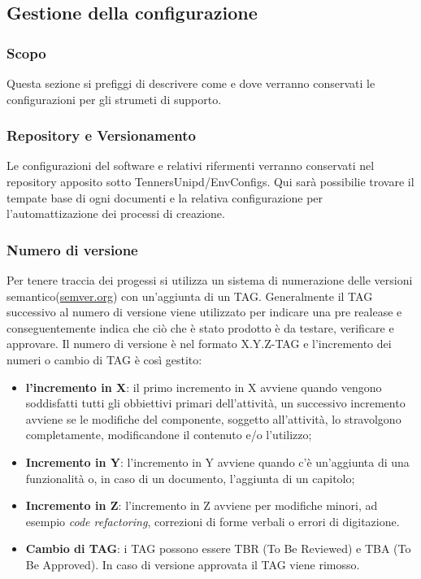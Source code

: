 \subsection{Gestione della configurazione}
\subsubsection{Scopo}
Questa sezione si prefiggi di descrivere come e dove verranno conservati le configurazioni
per gli strumeti di supporto.
\subsubsection{Repository e Versionamento}
Le configurazioni del software e relativi rifermenti verranno conservati nel repository
apposito sotto TennersUnipd/EnvConfigs.
Qui sarà possibilie trovare il tempate base di ogni documenti e la relativa configurazione
per l'automattizazione dei processi di creazione.

\subsubsection{Numero di versione}
Per tenere traccia dei progessi si utilizza un sistema di numerazione delle versioni
semantico(\href{https://semver.org/lang/it/}{semver.org}) con un'aggiunta di un TAG.
Generalmente il TAG successivo al numero di versione viene utilizzato per indicare una
pre realease e conseguentemente indica che ciò che è stato prodotto è da testare,
verificare e approvare.
Il numero di versione è nel formato X.Y.Z-TAG e l'incremento dei numeri o cambio
di TAG è così gestito:
\begin{itemize}
  \item \textbf{l'incremento in X}: il primo incremento in X avviene quando vengono
  soddisfatti tutti gli obbiettivi primari dell'attività, un successivo incremento
  avviene se le modifiche del componente, soggetto all'attività, lo stravolgono
  completamente, modificandone il contenuto e/o l'utilizzo;
  \item \textbf{Incremento in Y}: l'incremento in Y avviene quando c'è un'aggiunta
  di una funzionalità o, in caso di un documento, l'aggiunta di un capitolo;
  \item \textbf{Incremento in Z}: l'incremento in Z avviene per modifiche minori,
  ad esempio \textit{code refactoring\glos}, correzioni di forme verbali o errori di digitazione.
  \item \textbf{Cambio di TAG}: i TAG possono essere TBR (To Be Reviewed) e TBA (To Be Approved).
  In caso di versione approvata il TAG viene rimosso.
\end{itemize}

